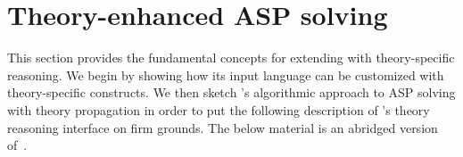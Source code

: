 
\section{Theory-enhanced ASP solving}
\label{sec:theory}

This section provides the fundamental concepts for extending \clingo{} with theory-specific reasoning.
We begin by showing how its input language can be customized with theory-specific constructs.
We then sketch \clingo's algorithmic approach to ASP solving with theory propagation
in order to put the following description of \clingo's theory reasoning interface on firm grounds.
The below material is an abridged version of~\cite{gekakaosscwa16a}.






